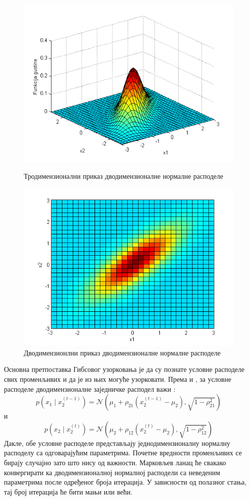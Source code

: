 \begin{figure}[H]
  \includegraphics[scale=0.5]{./Slike/slika25.png} 
  \caption{Тродимензионални приказ дводимензионалне нормалне расподеле}\label{fig:slika25}
\endminipage\hfill
{}
  \includegraphics[scale=0.5]{./Slike/slika26.png} 
  \caption{Дводимензионлни приказ дводимензионалне нормалне расподеле}\label{fig:slika26}
\endminipage\hfill

\end{figure}

Основна претпоставка Гибсовог узорковања је да су познате условне расподеле свих променљивих и да је из њих могуће узорковати. Према \cite{verov7} и \cite{verov8}, за условне расподеле дводимензионалне заједничке расподел важи :
$$
p(x_1 \mid x_2^{(t-1)}) = \mathcal{N}(\mu_1 + \rho_{21}(x_2^{(t-1)} - \mu_2),\sqrt{1-\rho_{21}^2})
$$
и
$$
p(x_2 \mid x_2^{(t)}) = \mathcal{N}(\mu_2 + \rho_{12}(x_2^{(t)} - \mu_2),\sqrt{1-\rho_{12}^2})
$$
Дакле, обе условне расподеле представљају једнодимензионалну нормалну расподелу са одговарајућим параметрима.
Почетне вредности променљивих се бирају случајно зато што нису од важности. Марковљев ланац ће свакако конвергирати ка дводимензионалној нормалној расподели са неведеним параметрима после одређеног броја итерација. У зависности од полазног стања, тај број итерација ће бити мањи или већи.

